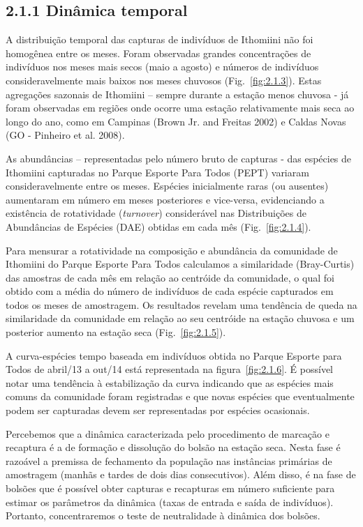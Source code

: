 \subsection{2.1.1 Dinâmica temporal} %
\label{sec:din-temp-borb}
A distribuição temporal das capturas de indivíduos de Ithomiini não
foi homogênea entre os meses. Foram observadas grandes concentrações
de indivíduos nos meses mais secos (maio a agosto) e números de
indivíduos consideravelmente mais baixos nos meses chuvosos
(Fig.~\ref{fig:2.1.3}). Estas agregações sazonais de Ithomiini –
sempre durante a estação menos chuvosa - já foram observadas em
regiões onde ocorre uma estação relativamente mais seca ao longo do
ano, como em Campinas (Brown Jr. and Freitas 2002) e Caldas Novas (GO
- Pinheiro et al. 2008).

As abundâncias – representadas pelo número bruto de capturas - das
espécies de Ithomiini capturadas no Parque Esporte Para Todos (PEPT)
variaram consideravelmente entre os meses. Espécies inicialmente raras
(ou ausentes) aumentaram em número em meses posteriores e vice-versa,
evidenciando a existência de rotatividade (\emph{turnover}) considerável nas
Distribuições de Abundâncias de Espécies (DAE) obtidas em cada mês
(Fig.~\ref{fig:2.1.4}).

Para mensurar a rotatividade na composição e
abundância da comunidade de Ithomiini do Parque Esporte Para Todos
calculamos a similaridade (Bray-Curtis) das amostras de cada mês em
relação ao centróide da comunidade, o qual foi obtido com a
média do número de indivíduos de cada espécie capturados em todos os
meses de amostragem. Os resultados revelam uma tendência de queda na
similaridade da comunidade em relação ao seu centróide na estação
chuvosa e um posterior aumento na estação seca (Fig.~\ref{fig:2.1.5}).

A curva-espécies tempo baseada em indivíduos obtida no Parque Esporte
para Todos de abril/13 a out/14 está representada na
figura~\ref{fig:2.1.6}. É possível notar uma tendência à estabilização
da curva indicando que as espécies mais comuns da comunidade foram
registradas e que novas espécies que eventualmente podem ser
capturadas devem ser representadas por espécies ocasionais.

Percebemos que a dinâmica caracterizada pelo procedimento de marcação e recaptura
é a de formação e dissolução do bolsão na estação seca.
Nesta fase é razoável a premissa de fechamento da população nas instâncias primárias
de amostragem (manhãs e tardes de dois dias consecutivos). Além disso, é na fase de bolsões
que é possível obter capturas e recapturas em número suficiente para estimar os parâmetros
da dinâmica (taxas de entrada e saída de indivíduos). Portanto, concentraremos 
o teste de neutralidade à dinâmica dos bolsões. 
